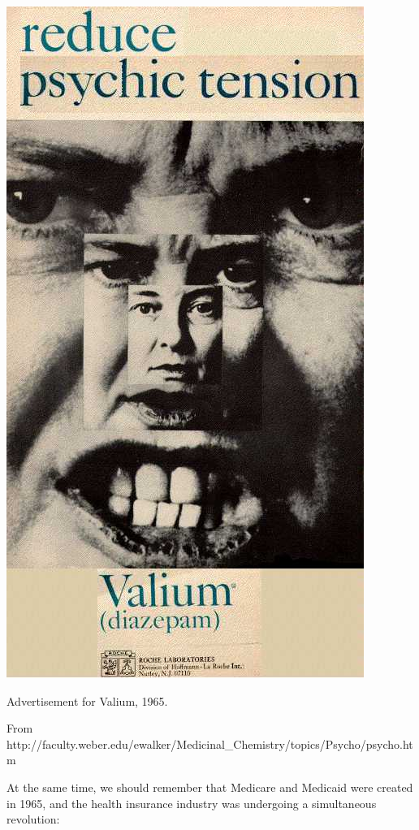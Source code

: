 \begin{refsection}
\begin{itemize}
\begin{marginfigure}
\begin{center}
 \includegraphics{../images/valium65.jpg}
\end{center}
 \caption{Advertisement for Valium, 1965.  }
\label{fig: valium65}
\end{marginfigure}

From http:\slash \slash faculty.weber.edu\slash ewalker\slash Medicinal\_Chemistry\slash topics\slash Psycho\slash psycho.htm

\end{itemize}

At the same time, we should remember that Medicare and Medicaid were created in 1965, and the health insurance industry was undergoing a simultaneous revolution: 


\end{refsection}
